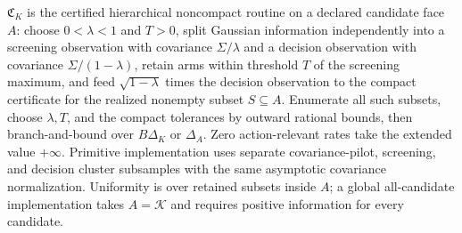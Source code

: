 \(\mathfrak C_K\) is the certified hierarchical noncompact routine on a declared candidate face \(A\): choose \(0<\lambda<1\) and \(T>0\), split Gaussian information independently into a screening observation with covariance \(\Sigma/\lambda\) and a decision observation with covariance \(\Sigma/(1-\lambda)\), retain arms within threshold \(T\) of the screening maximum, and feed \(\sqrt{1-\lambda}\) times the decision observation to the compact certificate for the realized nonempty subset \(S\subseteq A\).  Enumerate all such subsets, choose \(\lambda,T\), and the compact tolerances by outward rational bounds, then branch-and-bound over \(B\Delta_K\) or \(\Delta_A\).  Zero action-relevant rates take the extended value \(+\infty\).  Primitive implementation uses separate covariance-pilot, screening, and decision cluster subsamples with the same asymptotic covariance normalization.  Uniformity is over retained subsets inside \(A\); a global all-candidate implementation takes \(A=\mathcal K\) and requires positive information for every candidate.